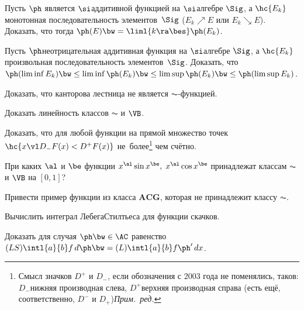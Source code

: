 \documentclass[a4paper,draft]{article}
\begin{document}
\begin{problem}
  Пусть $\ph$ является $\si$\д аддитивной функцией на $\si$\д алгебре $\Sig$, а $\hc{E_k}$\т
  монотонная последовательность элементов~$\Sig$ ( $E_k \nearrow E$ или $E_k \searrow E$).
  Доказать, что тогда $\ph(E)  \bw= \liml{k \ra \bes} \ph(E_k)$.
\end{problem}

\begin{problem}
  Пусть $\ph$\т неотрицательная аддитивная функция на $\si$\д алгебре $\Sig$, а $\hc{E_k}$\т
  произвольная последовательность элементов~$\Sig$. Доказать, что
  $\ph(\liminf E_k) \bw\le \liminf \ph(E_k) \bw\le \limsup \ph(E_k) \bw\le \ph(\limsup E_k)$.
\end{problem}

\begin{problem}
  Доказать, что канторова лестница не является $\AC$-функцией.
\end{problem}

\begin{problem}
  Доказать линейность классов $\AC$ и $\VB$.
\end{problem}

\begin{problem}
  Доказать, что для любой функции на прямой множество точек $\hc{x\vl D_-F(x) < D^+F(x)}$
  не~более\footnote{Смысл значков $D^+$ и $D_-$, если обозначения с 2003 года не поменялись, таков: $D_-$\т нижняя производная
  слева, $D^+$\т верхняя производная справа (есть ещё, соответственно, $D^-$ и $D_+$)\т \emph{Прим.~ред.}} чем счётно.
\end{problem}

\begin{problem}
  При каких $\al$ и  $\be$ функции $x^\al\sin x^\be, \; x^\al \cos x^\be$ принадлежат
  классам $\AC$ и $\VB$ на $[0,1]$?
\end{problem}

\begin{problem}
  Привести пример функции из класса $\mathbf{ACG}$, которая не принадлежит классу $\AC$.
\end{problem}

\begin{problem}
  Вычислить интеграл Лебега\ч Стилтьеса для функции скачков.
\end{problem}

\begin{problem}
  Доказать для случая $\ph \bw\in \AC$ равенство $(LS)\intl{a}{b}f\,d\ph \bw= (L)\intl{a}{b}f\ph'\,dx$.
\end{problem}
\end{document}
